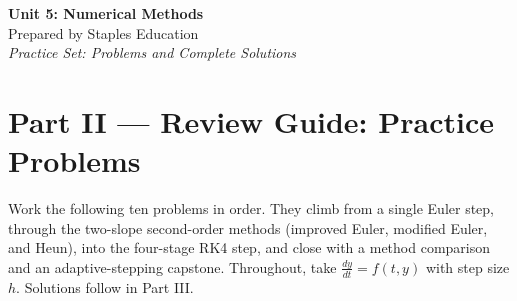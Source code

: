




\begin{center}
    {\LARGE \bfseries Unit 5: Numerical Methods}\\[6pt]
    {\large Prepared by Staples Education}\\[4pt]
    {\itshape Practice Set: Problems and Complete Solutions}
\end{center}

\vspace{0.4em}

{}
\section*{Part II --- Review Guide: Practice Problems}

Work the following ten problems in order. They climb from a single Euler step,
through the two-slope second-order methods (improved Euler, modified Euler, and
Heun), into the four-stage RK4 step, and close with a method comparison and an
adaptive-stepping capstone. Throughout, take $\frac{dy}{dt}=f(t,y)$ with step
size $h$. Solutions follow in Part III.

